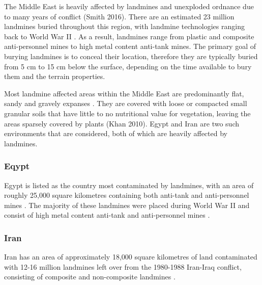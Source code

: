 \documentclass[main.tex]{subfiles}
\begin{document}
The Middle East is heavily affected by landmines and unexploded ordnance due to many years of conflict (Smith 2016). There are an estimated 23 million landmines buried throughout this region, with landmine technologies ranging back to World War II \parencite{Khamis13}. As a result, landmines range from plastic and composite anti-personnel mines to high metal content anti-tank mines. The primary goal of burying landmines is to conceal their location, therefore they are typically buried from 5 cm to 15 cm below the surface, depending on the time available to bury them and the terrain properties.

Most landmine affected areas within the Middle East are predominantly flat, sandy and gravely expanses \parencite{Nahrawy2011}. They are covered with loose or compacted small granular soils that have little to no nutritional value for vegetation, leaving the areas sparsely covered by plants (Khan 2010).  
Egypt and Iran are two such environments that are considered, both of which are heavily affected by landmines.

\subsubsection{Eqypt}

Egypt is listed as the country most contaminated by landmines, with an area of roughly 25,000 square kilometres containing both anti-tank and anti-personnel mines \parencite{Rushfan2008}. The majority of these landmines were placed during World War II and consist of high metal content anti-tank and anti-personnel mines \parencite{Khamis13}. %

\subsubsection{Iran}
Iran has an area of approximately 18,000 square kilometres of land contaminated with 12-16 million landmines left over from the 1980-1988 Iran-Iraq conflict, consisting of composite and non-composite landmines \parencite{landmineMonitor2015}. %
\end{document}
